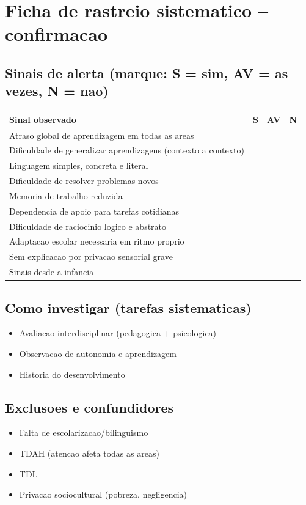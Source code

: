 \documentclass[a4paper,11pt]{book}
\begin{document}
\section*{Ficha de rastreio sistematico -- confirmacao}
\subsection*{Sinais de alerta (marque: S = sim, AV = as vezes, N = nao)}
\begin{tabular}{@{}p{11.5cm}ccc@{}}\toprule
Sinal observado & S & AV & N \\\midrule
Atraso global de aprendizagem em todas as areas & & & \\
Dificuldade de generalizar aprendizagens (contexto a contexto) & & & \\
Linguagem simples, concreta e literal & & & \\
Dificuldade de resolver problemas novos & & & \\
Memoria de trabalho reduzida & & & \\
Dependencia de apoio para tarefas cotidianas & & & \\
Dificuldade de raciocinio logico e abstrato & & & \\
Adaptacao escolar necessaria em ritmo proprio & & & \\
Sem explicacao por privacao sensorial grave & & & \\
Sinais desde a infancia & & & \\
\bottomrule\end{tabular}
\subsection*{Como investigar (tarefas sistematicas)}
\begin{itemize}
\item Avaliacao interdisciplinar (pedagogica + psicologica)
\item Observacao de autonomia e aprendizagem
\item Historia do desenvolvimento
\end{itemize}
\subsection*{Exclusoes e confundidores}
\begin{itemize}
\item Falta de escolarizacao/bilinguismo
\item TDAH (atencao afeta todas as areas)
\item TDL
\item Privacao sociocultural (pobreza, negligencia)
\end{itemize}
\end{document}
